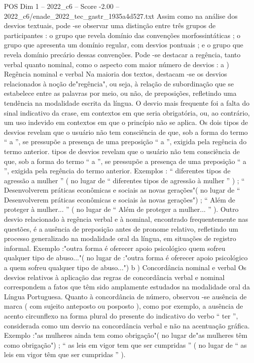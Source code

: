 \begin{textsample}{POS Dim 1 – 2022\_c6 – Score -2.00 – 2022\_c6/enade\_2022\_tec\_gastr\_1935a4d527.txt}
Assim como na análise dos desvios textuais, pode -se observar uma distinção entre três grupos de participantes : o grupo que revela domínio das convenções morfossintáticas ; o grupo que apresenta um domínio regular, com desvios pontuais ; e o grupo que revela domínio precário dessas convenções.
Pode -se destacar a regência, tanto verbal quanto nominal, como o aspecto com maior número de desvios : a ) Regência nominal e verbal Na maioria dos textos, destacam -se os desvios relacionados à noção de"regência", ou seja, à relação de subordinação que se estabelece entre as palavras por meio, ou não, de preposições, refletindo uma tendência na modalidade escrita da língua.
O desvio mais frequente foi a falta do sinal indicativo da crase, em contextos em que seria obrigatória, ou, ao contrário, um uso indevido em contextos em que o princípio não se aplica.
Os dois tipos de desvios revelam que o usuário não tem consciência de que, sob a forma do termo “ a ”, se pressupõe a presença de uma preposição “ a ”, exigida pela regência do termo anterior. tipos de desvios revelam que o usuário não tem consciência de que, sob a forma do termo “ a ”, se pressupõe a presença de uma preposição “ a ”, exigida pela regência do termo anterior.
Exemplos : “ diferentes tipos de agressão a mulher ” ( no lugar de “ diferentes tipos de agressão à mulher ” ) ; “ Desenvolverem práticas econômicas e sociais as novas gerações"( no lugar de “ Desenvolverem práticas econômicas e sociais às novas gerações") ; “ Além de proteger à mulher... ” ( no lugar de “ Além de proteger a mulher... ” ).
Outro desvio relacionado à regência verbal e à nominal, encontrado frequentemente nas questões, é a ausência de preposição antes de pronome relativo, refletindo um processo generalizado na modalidade oral da língua, em situações de registro informal.
Exemplo :"outra forma é oferecer apoio psicológico quem sofreu qualquer tipo de abuso..."( no lugar de :"outra forma é oferecer apoio psicológico a quem sofreu qualquer tipo de abuso...") b ) Concordância nominal e verbal Os desvios relativos à aplicação das regras de concordância verbal e nominal correspondem a fatos que têm sido amplamente estudados na modalidade oral da Língua Portuguesa.
Quanto à concordância de número, observou -se ausência de marca ( com sujeito anteposto ou posposto ), como por exemplo, a ausência de acento circunflexo na forma plural do presente do indicativo do verbo “ ter ”, considerada como um desvio na concordância verbal e não na acentuação gráfica.
Exemplo :"as mulheres ainda tem como obrigação"( no lugar de"as mulheres têm como obrigação") ; “ as leis em vigor tem que ser cumpridas ” ( no lugar de “ as leis em vigor têm que ser cumpridas ” ).

\end{textsample}

